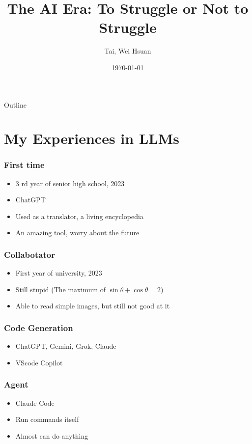 \documentclass[xcolor=dvipsnames]{beamer}
\title{The AI Era: To Struggle or Not to Struggle}
\author{Tai, Wei Hsuan}
\date{\today}
\begin{document}
\begin{frame}
    \titlepage
\end{frame}

\begin{frame}{Outline}
    \tableofcontents
\end{frame}

\section{My Experiences in LLMs}
\begin{frame}
    \frametitle{First time}
    \begin{itemize}
        \item 3 rd year of senior high school, 2023
        \item ChatGPT
        \item Used as a translator, a living encyclopedia
        \item An amazing tool, worry about the future
    \end{itemize}
\end{frame}

\begin{frame}
    \frametitle{Collabotator}
    \begin{itemize}
        \item First year of university, 2023
        \item Still stupid (The maximum of $\sin\theta+\cos\theta=2$)
        \item Able to read simple images, but still not good at it
    \end{itemize}
\end{frame}

\begin{frame}
    \frametitle{Code Generation}
    \begin{itemize}
        \item ChatGPT, Gemini, Grok, Claude
        \item VScode Copilot
    \end{itemize}
\end{frame}

\begin{frame}
    \frametitle{Agent}
    \begin{itemize}
        \item Claude Code
        \item Run commands itself
        \item Almost can do anything
    \end{itemize}
\end{frame}
\end{document}
